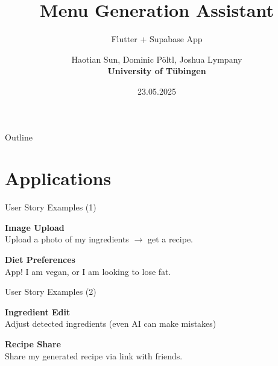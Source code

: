 \documentclass{beamer}
\title{Menu Generation Assistant}
\subtitle{Flutter + Supabase App}
\author{Haotian Sun, Dominic Pöltl, Joshua Lympany \\ \textbf{University of Tübingen}}
\date{23.05.2025}
\institute{Department of Marketing}
\begin{document}
\begin{frame}
    \titlepage
\end{frame}

\begin{frame}{Outline}
    \tableofcontents
\end{frame}







\section{Applications}
\begin{frame}{User Story Examples (1)}
  \begin{flushleft}
    \textbf{Image Upload} \\
    Upload a photo of my ingredients $\rightarrow$ get a recipe.
  \end{flushleft}\vspace{4mm}
  \begin{flushright}
    \textbf{Diet Preferences}\\
    App! I am vegan, or I am looking to lose fat.
  \end{flushright}
\end{frame}

\begin{frame}{User Story Examples (2)}
  \begin{flushleft}
    \textbf{Ingredient Edit}\\
    Adjust detected ingredients (even AI can make mistakes)
  \end{flushleft}\vspace{4mm}
  \begin{flushright}
    \textbf{Recipe Share}\\
    Share my generated recipe via link with friends.
  \end{flushright}
\end{frame}

\end{document}
